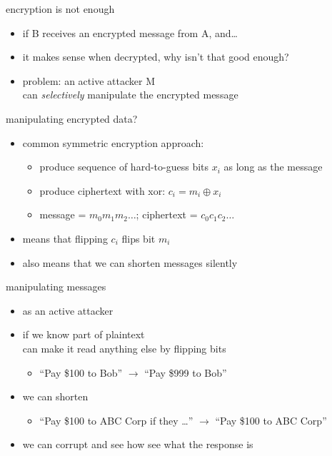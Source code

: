 \begin{frame}{encryption is not enough}
    \begin{itemize}
    \item if B receives an encrypted message from A, and\ldots
    \item it makes sense when decrypted, why isn't that good enough?
    \vspace{.5cm}
    \item problem: an active attacker M \\
        can \textit{selectively} manipulate the encrypted message
    \end{itemize}
\end{frame}

\begin{frame}{manipulating encrypted data?}
\begin{itemize}
\item common symmetric encryption approach:
    \begin{itemize}
    \item produce sequence of hard-to-guess bits $x_i$ as long as the message
    \item produce ciphertext with xor: $c_i = m_i \oplus x_i$
        \item message = $m_0m_1m_2\ldots$; ciphertext = $c_0c_1c_2\ldots$
    \end{itemize}
\item means that flipping $c_i$ flips bit $m_i$ 
\item also means that we can shorten messages silently
\end{itemize}
\end{frame}

\begin{frame}{manipulating messages}
\begin{itemize}
\item as an active attacker
\vspace{.5cm}
\item if we know part of plaintext \\
    can make it read anything else by flipping bits
    \begin{itemize}
    \item ``Pay \$100 to Bob'' $\rightarrow$ ``Pay \$999 to Bob''
    \end{itemize}
\item we can shorten 
    \begin{itemize}
    \item ``Pay \$100 to ABC Corp if they \ldots'' $\rightarrow$ ``Pay \$100 to ABC Corp''
    \end{itemize}
\item we can corrupt and see how see what the response is
\end{itemize}
\end{frame}
